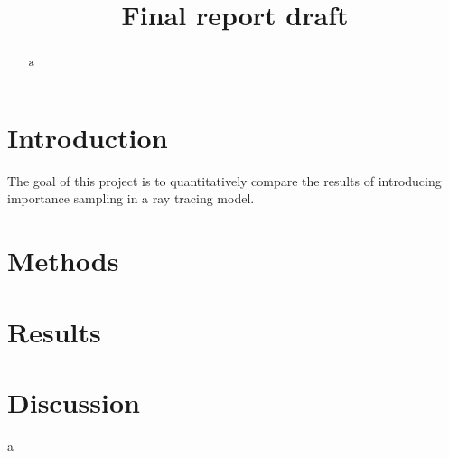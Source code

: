 \documentclass[12pt]{article}
\title{Final report draft}
\begin{document}
\maketitle
\begin{abstract}
a
\end{abstract}
\section{Introduction}
	The goal of this project is to quantitatively compare the results of introducing importance sampling in a ray tracing model.
    
\section{Methods}

\section{Results}

\section{Discussion}
a
\end{document}
